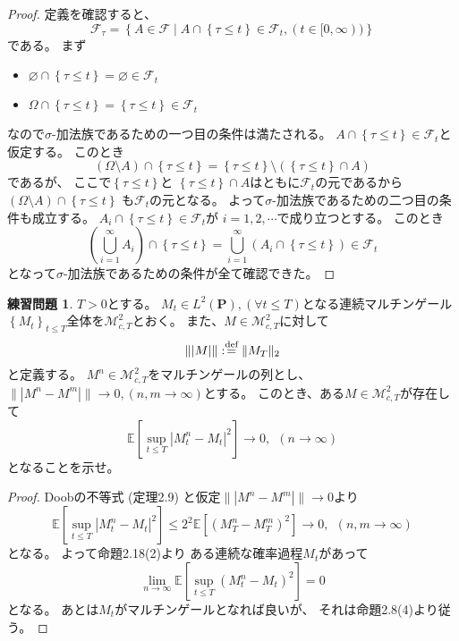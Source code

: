 \documentclass[uplatex]{jsarticle}
\theoremstyle{definition}
\newtheorem{prob}[prob]{練習問題}
\renewcommand{\emptyset}{\varnothing}
\def\P{\mathbf{P}}
\def\E{\mathbb{E}}
\def\mcF{\mathcal{F}}
\def\mcM{\mathcal{M}}
\def\dfn{:\overset{\mbox{{\scriptsize def}}}{=}}
\begin{document}
\begin{proof}
  定義を確認すると、
  \[
  \mcF_{\tau} = \left\{ A \in \mcF \middle|
  A\cap \left\{\tau \leq t \right\} \in \mcF_t, (t\in [0,\infty))\right\}
  \]
  である。
  まず
  \begin{itemize}
    \item
    \(\emptyset \cap \left\{\tau\leq t\right\} = \emptyset \in \mcF_t\)
    \item
    \(\Omega \cap \left\{\tau\leq t\right\} = \left\{\tau\leq t\right\} \in \mcF_t\)
  \end{itemize}
  なので\(\sigma\)-加法族であるための一つ目の条件は満たされる。
  \(A\cap \left\{\tau\leq t\right\} \in \mcF_t\)と仮定する。
  このとき
  \[
  (\Omega \setminus A) \cap \left\{\tau\leq t\right\}
  = \left\{\tau\leq t\right\} \setminus \left( \left\{\tau\leq t\right\} \cap A \right)
  \]
  であるが、
  ここで\(\left\{\tau\leq t\right\}\)と
  \(\left\{\tau\leq t\right\}\cap A\)はともに\(\mcF_t\)の元であるから
  \((\Omega \setminus A) \cap \left\{\tau\leq t\right\}\)
  も\(\mcF_t\)の元となる。
  よって\(\sigma\)-加法族であるための二つ目の条件も成立する。
  \(A_i\cap \left\{\tau\leq t\right\} \in \mcF_t\)が
  \(i=1,2,\cdots\)で成り立つとする。
  このとき
  \[
  \left( \bigcup_{i=1}^\infty A_i\right) \cap \left\{\tau\leq t\right\}
  = \bigcup_{i=1}^\infty \left( A_i \cap \left\{\tau\leq t\right\} \right)
  \in \mcF_t
  \]
  となって\(\sigma\)-加法族であるための条件が全て確認できた。
\end{proof}














\begin{prob}\label{prob: 2.6}
  \(T > 0\)とする。
  \(M_t\in L^2(\P), (\forall t\leq T)\)となる連続マルチンゲール
  \(\left\{ M_t\right\}_{t\leq T}\)全体を\(\mcM^2_{c,T}\)とおく。
  また、\(M\in \mcM^2_{c,T}\)に対して
  \[
  \| |M| \| \dfn \|M_T\|_2
  \]
  と定義する。
  \(M^n\in \mcM^2_{c,T}\)をマルチンゲールの列とし、
  \(\| |M^n-M^m| \| \to 0 , (n,m\to \infty)\)とする。
  このとき、ある\(M\in \mcM^2_{c,T}\)が存在して
  \[
  \E\left[ \sup_{t\leq T}|M^n_t - M_t|^2\right]\to 0 , \ \ (n\to \infty)
  \]
  となることを示せ。
\end{prob}

\begin{proof}
  Doobの不等式 (定理2.9) と仮定\(\| |M^n-M^m|\| \to 0\)より
  \[
  \E \left[ \sup_{t\leq T}|M^n_t - M_t|^2\right]
   \leq 2^2 \E\left[ (M_T^n-M_T^m)^2 \right]\to 0 , \ \ (n,m\to \infty)
  \]
  となる。
  よって命題2.18(2)より
  ある連続な確率過程\(M_t\)があって
  \[
  \lim_{n\to \infty} \E \left[
  \sup_{t\leq T}(M_t^n-M_t)^2\right] = 0
  \]
  となる。
  あとは\(M_t\)がマルチンゲールとなれば良いが、
  それは命題2.8(4)より従う。
\end{proof}
\end{document}
